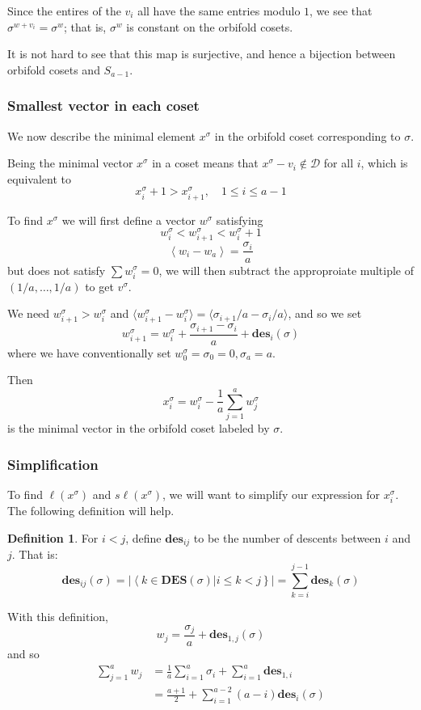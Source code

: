 \documentclass{amsart}[12pt]
\theoremstyle{definition}
\newtheorem{definition}[dummy]{Definition}
\newcommand{\sk}{s\ell}
\newcommand{\DES}{\mathbf{DES}}
\newcommand{\des}{\mathbf{des}}
\newcommand{\dominant}{\mathcal{D}}
\begin{document}
Since the entires of the $v_i$ all have the same entries modulo $1$, we see that$\sigma^{w+v_i}=\sigma^w$; that is, $\sigma^w$ is constant on the orbifold cosets.  

It is not hard to see that this map is surjective, and hence a bijection between orbifold cosets and $S_{a-1}$.

\subsubsection{Smallest vector in each coset}
We now describe the minimal element $x^\sigma$ in the orbifold coset corresponding to $\sigma$.  

Being the minimal vector $x^\sigma$ in a coset means that $x^\sigma-v_i\notin\dominant$ for all $i$, which is equivalent to
$$x^\sigma_i+1>x^\sigma_{i+1},\quad 1\leq i\leq a-1$$

To find $x^\sigma$ we will first define a vector $w^\sigma$ satisfying
$$w^\sigma_i<w^\sigma_{i+1}<w^\sigma_i+1$$
$$\left\langle w_i-w_a\right\rangle=\frac{\sigma_i}{a}$$
but does not satisfy $\sum w_i^\sigma=0$, we will then subtract the approproiate multiple of $(1/a,\dots, 1/a)$ to get $v^\sigma$.

We need $w^\sigma_{i+1}>w^\sigma_i$ and $\langle w^\sigma_{i+1}-w^\sigma_i\rangle=\langle\sigma_{i+1}/a-\sigma_i/a\rangle$, and so we set
$$w^\sigma_{i+1}=w^\sigma_i+\frac{\sigma_{i+1}-\sigma_i}{a}+\des_i(\sigma)$$
where we have conventionally set $w^\sigma_0=\sigma_0=0, \sigma_a=a$.

Then
$$x_i^\sigma=w_i^\sigma-\frac{1}{a}\sum_{j=1}^a w^\sigma_j$$
is the minimal vector in the orbifold coset labeled by $\sigma$.
\subsubsection{Simplification}
 To find $\ell(x^\sigma)$ and $\sk(x^\sigma)$, we will want to simplify our expression for $x_i^\sigma$.  The following definition will help.
\begin{definition}
For $i<j$, define $\des_{ij}$ to be the number of descents between $i$ and $j$.  That is:
$$\des_{ij}(\sigma)=\left|\left\langle k\in\DES(\sigma)\big| i\leq k < j\right\}\right|=\sum_{k=i}^{j-1}\des_k(\sigma)$$
\end{definition}

With this definition,
$$w_j=\frac{\sigma_j}{a}+\des_{1,j}(\sigma)$$
and so
\begin{align*}
\sum_{j=1}^a w_j &=\frac{1}{a}\sum_{i=1}^a \sigma_i +\sum_{i=1}^a \des_{1,i} \\
 &=\frac{a+1}{2}+\sum_{i=1}^{a-2} (a-i)\des_i(\sigma)
\end{align*}
\end{document}
